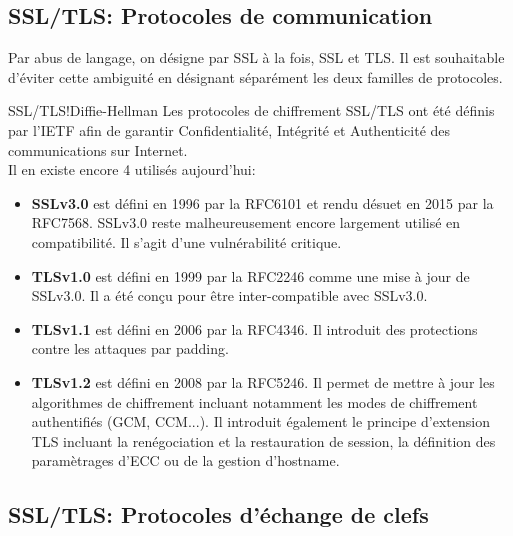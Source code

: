 \documentclass[twoside,a4paper,12pt,titlepage]{book}
\begin{document}
\subsection{SSL/TLS: Protocoles de communication}
\begin{Stop}
Par abus de langage, on désigne par SSL à la fois, \gls{SSL} et \gls{TLS}. Il est souhaitable d'éviter cette ambiguité en désignant séparément les deux familles de protocoles.
\end{Stop}
\begin{Define}{SSL/TLS!Diffie-Hellman}
Les protocoles de chiffrement SSL/TLS ont été définis par l'\gls{IETF} afin de garantir Confidentialité, Intégrité et Authenticité des communications sur Internet.\\
Il en existe encore 4 utilisés aujourd'hui:\begin{itemize}
\item \textbf{\gls{SSL}v3.0} est défini en 1996 par la \gls{RFC}6101 et rendu désuet en 2015 par la \gls{RFC}7568. SSLv3.0 reste malheureusement encore largement utilisé en compatibilité. Il s'agit d'une vulnérabilité critique.
\item \textbf{\gls{TLS}v1.0} est défini en 1999 par la \gls{RFC}2246 comme une mise à jour de SSLv3.0. Il a été conçu pour être inter-compatible avec SSLv3.0.
\item \textbf{\gls{TLS}v1.1} est défini en 2006 par la \gls{RFC}4346. Il introduit des protections contre les attaques par padding.
\item \textbf{\gls{TLS}v1.2} est défini en 2008 par la \gls{RFC}5246. Il permet de mettre à jour les algorithmes de chiffrement incluant notamment les modes de chiffrement authentifiés (\gls{GCM}, \gls{CCM}...). Il introduit également le principe d'extension TLS incluant la renégociation et la restauration de session, la définition des paramètrages d'\gls{ECC} ou de la gestion d'hostname.
\end{itemize}
\end{Define}

\subsection{SSL/TLS: Protocoles d'échange de clefs}
\end{document}
